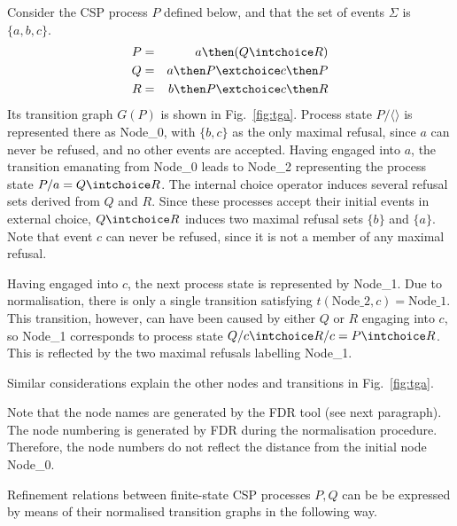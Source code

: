 \begin{example}\label{ex:a}
Consider the CSP process $P$ defined below, and that the set of events
$\Sigma$ is $\{a,b,c\}$.
\begin{eqnarray*}
P & = & a \then (Q\intchoice R)
\\
Q & = & a \then P \extchoice c \then P
\\
R & = & b \then P \extchoice c \then R
\end{eqnarray*}
Its transition graph $G(P)$ is shown in Fig.~\ref{fig:tga}. Process state
$P/\langle\rangle$ is represented there as Node\_0, with $\{ b,c\}$ as the
only maximal refusal, since $a$ can never be refused, and no other events are
accepted. Having engaged into $a$, the transition emanating from Node\_0
leads to Node\_2 representing  the process state $P/a = Q\intchoice R$. The
internal choice operator induces several refusal sets derived from $Q$ and
$R$. Since these processes accept their initial events in external choice,
$Q\intchoice R$ induces two maximal refusal sets $\{b\}$ and
$\{a\}$. Note that event $c$ can never be refused, since it is not a member
of any maximal refusal.

Having engaged into $c$, the next process state is represented by Node\_1.
Due to normalisation, there is only a single transition satisfying
$t(\text{Node\_2},c) = \text{Node\_1}$. This transition, however, can have
been caused by either $Q$ or $R$ engaging into $c$, so Node\_1 corresponds to
process state $Q/c \intchoice R/c = P \intchoice R$. This is reflected by the
two maximal refusals labelling Node\_1.

Similar considerations explain the other nodes and transitions in
Fig.~\ref{fig:tga}.

Note that the node names are generated by the FDR tool (see next paragraph).
The node numbering is generated by FDR during the normalisation procedure.
Therefore, the node numbers do not reflect the distance from the initial node
Node\_0.
\end{example}

Refinement relations between finite-state CSP processes $P, Q$ 
can be be expressed by means of their normalised transition graphs in the following way.

